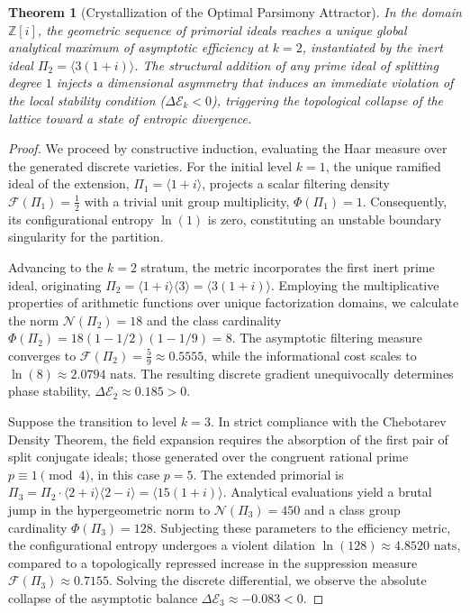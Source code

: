 \documentclass{article}
\numberwithin{equation}{section}
\theoremstyle{plain}
\newtheorem{theorem}{Theorem}[section]
\theoremstyle{definition}
\begin{document}
\begin{theorem}[Crystallization of the Optimal Parsimony Attractor]
\label{teo:chandrasekhar_lattice_formal}
In the domain $\mathbb{Z}[i]$, the geometric sequence of primorial ideals reaches a unique global analytical maximum of asymptotic efficiency at $k=2$, instantiated by the inert ideal $\Pi_2 = \langle 3(1+i) \rangle$. The structural addition of any prime ideal of splitting degree $1$ injects a dimensional asymmetry that induces an immediate violation of the local stability condition ($\Delta \mathcal{E}_k < 0$), triggering the topological collapse of the lattice toward a state of entropic divergence.
\end{theorem}

\begin{proof}
We proceed by constructive induction, evaluating the Haar measure over the generated discrete varieties.
For the initial level $k=1$, the unique ramified ideal of the extension, $\Pi_1 = \langle 1+i \rangle$, projects a scalar filtering density $\mathcal{F}(\Pi_1) = \frac{1}{2}$ with a trivial unit group multiplicity, $\Phi(\Pi_1) = 1$. Consequently, its configurational entropy $\ln(1)$ is zero, constituting an unstable boundary singularity for the partition.

Advancing to the $k=2$ stratum, the metric incorporates the first inert prime ideal, originating $\Pi_2 = \langle 1+i \rangle \langle 3 \rangle = \langle 3(1+i) \rangle$. Employing the multiplicative properties of arithmetic functions over unique factorization domains, we calculate the norm $\mathcal{N}(\Pi_2) = 18$ and the class cardinality $\Phi(\Pi_2) = 18(1 - 1/2)(1 - 1/9) = 8$.
The asymptotic filtering measure converges to $\mathcal{F}(\Pi_2) = \frac{5}{9} \approx 0.5555$, while the informational cost scales to $\ln(8) \approx 2.0794 \text{ nats}$. The resulting discrete gradient unequivocally determines phase stability, $\Delta \mathcal{E}_2 \approx 0.185 > 0$.

Suppose the transition to level $k=3$. In strict compliance with the Chebotarev Density Theorem, the field expansion requires the absorption of the first pair of split conjugate ideals; those generated over the congruent rational prime $p \equiv 1 \pmod 4$, in this case $p=5$. The extended primorial is $\Pi_3 = \Pi_2 \cdot \langle 2+i \rangle \langle 2-i \rangle = \langle 15(1+i) \rangle$. Analytical evaluations yield a brutal jump in the hypergeometric norm to $\mathcal{N}(\Pi_3) = 450$ and a class group cardinality $\Phi(\Pi_3) = 128$.
Subjecting these parameters to the efficiency metric, the configurational entropy undergoes a violent dilation $\ln(128) \approx 4.8520 \text{ nats}$, compared to a topologically repressed increase in the suppression measure $\mathcal{F}(\Pi_3) \approx 0.7155$.
Solving the discrete differential, we observe the absolute collapse of the asymptotic balance $\Delta \mathcal{E}_3 \approx -0.083 < 0$.


\end{proof}
\end{document}
